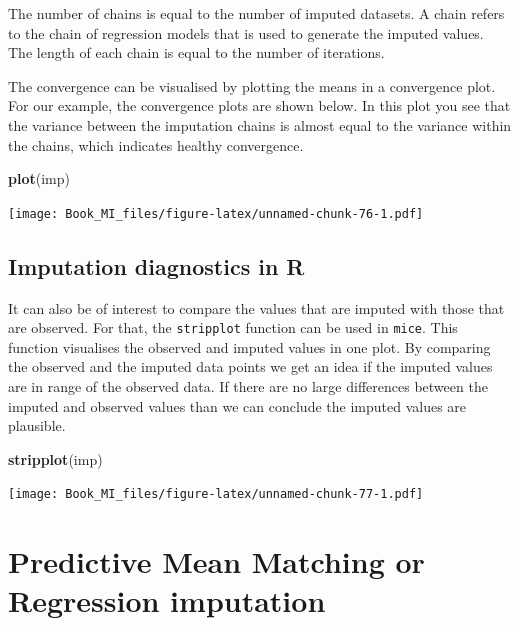 \documentclass[
]{book}
\newenvironment{Shaded}{\begin{snugshade}}{\end{snugshade}}
\newcommand{\KeywordTok}[1]{\textcolor[rgb]{0.13,0.29,0.53}{\textbf{#1}}}
\newcommand{\NormalTok}[1]{#1}
\begin{document}
The number of chains is equal to the number of imputed datasets. A chain refers to the chain of regression models that is used to generate the imputed values. The length of each chain is equal to the number of iterations.

The convergence can be visualised by plotting the means in a convergence plot. For our example, the convergence plots are shown below. In this plot you see that the variance between the imputation chains is almost equal to the variance within the chains, which indicates healthy convergence.

\begin{Shaded}
\begin{Highlighting}[]
\KeywordTok{plot}\NormalTok{(imp)}
\end{Highlighting}
\end{Shaded}

\texttt{[image: Book\_MI\_files/figure-latex/unnamed-chunk-76-1.pdf]}

\hypertarget{imputation-diagnostics-in-r}{%
\subsection{Imputation diagnostics in R}\label{imputation-diagnostics-in-r}}

It can also be of interest to compare the values that are imputed with those that are observed. For that, the \texttt{stripplot} function can be used in \texttt{mice}. This function visualises the observed and imputed values in one plot. By comparing the observed and the imputed data points we get an idea if the imputed values are in range of the observed data. If there are no large differences between the imputed and observed values than we can conclude the imputed values are plausible.

\begin{Shaded}
\begin{Highlighting}[]
\KeywordTok{stripplot}\NormalTok{(imp)}
\end{Highlighting}
\end{Shaded}

\texttt{[image: Book\_MI\_files/figure-latex/unnamed-chunk-77-1.pdf]}

\hypertarget{predictive-mean-matching-or-regression-imputation}{%
\section{Predictive Mean Matching or Regression imputation}\label{predictive-mean-matching-or-regression-imputation}}
\end{document}
